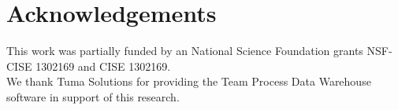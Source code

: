 \documentclass{sig-alternate}
\newcommand{\fig}[1]{Figure~\ref{fig:#1}}
\begin{document}



\section*{Acknowledgements}
This work was partially funded by an National Science
Foundation grants NSF-CISE 1302169 and CISE 1302169. 
\\
We thank Tuma Solutions for providing the Team Process Data Warehouse software in support of this research.  


\clearpage
\vspace*{0.5mm}
\scriptsize

 
\end{document}
